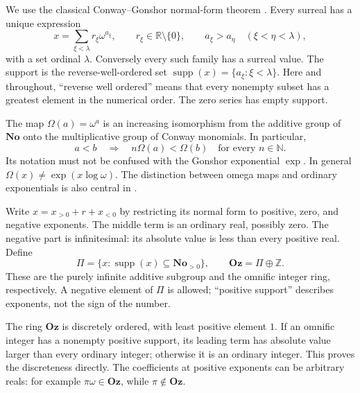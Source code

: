 \documentclass[11pt,a4paper]{article}
\numberwithin{equation}{section}
\theoremstyle{definition}
\theoremstyle{remark}
\newcommand{\No}{\mathbf{No}}
\newcommand{\Oz}{\mathbf{Oz}}
\newcommand{\N}{\mathbb N}
\newcommand{\Z}{\mathbb Z}
\newcommand{\R}{\mathbb R}
\newcommand{\supp}{\operatorname{supp}}
\begin{document}
We use the classical Conway--Gonshor normal-form theorem
\cite{Conway,Gonshor,PK}.  Every surreal has a unique expression
\begin{equation}\label{dsn:op:eq:nf}
 x=\sum_{\xi<\lambda}r_\xi\omega^{a_\xi},
 \qquad r_\xi\in\R\setminus\{0\},\qquad
 a_\xi>a_\eta\quad(\xi<\eta<\lambda),
\end{equation}
with a set ordinal \(\lambda\).  Conversely every such family has a
surreal value.  The support is the reverse-well-ordered set
\(\supp(x)=\{a_\xi:\xi<\lambda\}\).  Here and throughout,
``reverse well ordered'' means that every nonempty subset has a greatest
element in the numerical order.  The zero series has empty support.

The map \(\Omega(a)=\omega^a\) is an increasing isomorphism from the
additive group of \(\No\) onto the multiplicative group of Conway
monomials.  In particular,
\begin{equation}\label{dsn:op:eq:omega-gap}
 a<b\quad\Longrightarrow\quad
 n\Omega(a)<\Omega(b)\quad\text{for every }n\in\N.
\end{equation}
Its notation must not be confused with the Gonshor exponential
\(\exp\).  In general \(\Omega(x)\ne\exp(x\log\omega)\).
The distinction between omega maps and ordinary exponentials is also
central in \cite{BKMMe}.

Write \(x=x_{>0}+r+x_{<0}\) by restricting its normal form to positive,
zero, and negative exponents.  The middle term is an ordinary real,
possibly zero.  The negative part is infinitesimal: its absolute value
is less than every positive real.  Define
\begin{equation}\label{dsn:op:eq:oz}
 \Pi=\{x:\supp(x)\subseteq\No_{>0}\},\qquad
 \Oz=\Pi\oplus\Z.
\end{equation}
These are the purely infinite additive subgroup and the omnific integer
ring, respectively.  A negative element of \(\Pi\) is allowed;
``positive support'' describes exponents, not the sign of the number.

The ring \(\Oz\) is discretely ordered, with least positive element
\(1\).  If an omnific integer has a nonempty positive support, its
leading term has absolute value larger than every ordinary integer;
otherwise it is an ordinary integer.  This proves the discreteness
directly.  The coefficients at positive exponents can be arbitrary reals:
for example \(\pi\omega\in\Oz\), while \(\pi\notin\Oz\).
\end{document}

